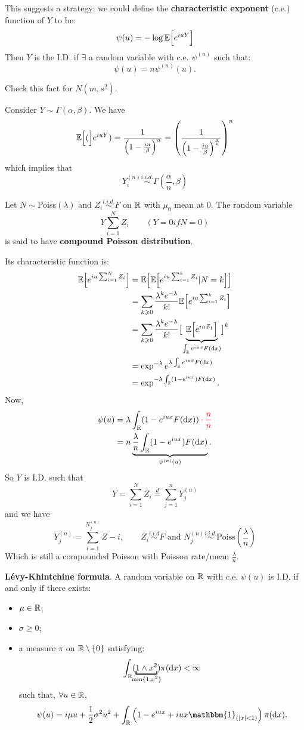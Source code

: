 \documentclass[class=article,crop=false]{standalone}
\begin{document}
This suggests a strategy: we could define the \textbf{characteristic exponent} (c.e.) function of $Y$ to be:
\[
\psi(u)=-\log\mathbb{E}\Bigl[{e^{iuY}}\Bigr]
\]
Then $Y$ is the I.D. if $\exists$ a random variable with c.e. $\psi^{(n)}$ such that:
\[\psi(u)=n\psi^{(n)}(u).\]
\begin{exercise}
	Check this fact for $N(m,s^2)$.
\end{exercise}
\begin{example}
	Consider $Y\sim\Gamma(\alpha,\beta)$. We have
	\[
	\mathbb{E}\Bigl[{(}\Bigr]e^{iuY})=\frac{1}{\left(1-\frac{iu}{\beta}\right)^\alpha}=\left(\frac{1}{\left(1-\frac{iu}{\beta}\right)^\frac{\alpha}{n}}\right)^n
	\]
	which implies that 
	\[
	Y_i^{(n)}\stackrel{i.i.d.}{\sim}\Gamma(\frac{\alpha}{n},\beta)
	\]
\end{example}
\begin{definition}
	Let $N\sim$Poiss$(\lambda)$ and $Z_i\stackrel{i.i.d.}{\sim}F$ on $\mathbb{R}$ with $\mu_0$ mean at 0. The random variable
	\[Y\sum_{i=1}^{N}Z_i\qquad(Y=0 if N=0)\]
	is said to have \textbf{compound Poisson distribution}.
\end{definition}
Its characteristic function is:
\begin{align*}
	\mathbb{E}\Bigl[{e^{iu\sum_{i=1}^{N}Z_i}}\Bigr]&=\mathbb{E}\Bigl[{\mathbb{E}\Bigl[{e^{iu\sum_{i=1}^{k}Z_i}|N=k}\Bigr]}\Bigr]\\
	&=\sum_{k\geqslant0}\frac{\lambda^ke^{-\lambda}}{k!}\mathbb{E}\Bigl[{e^{iu\sum_{i=1}^{k}Z_i}}\Bigr]\\
	&=\sum_{k\geqslant0}\frac{\lambda^ke^{-\lambda}}{k!}\bigl[\underbrace{\mathbb{E}\Bigl[{e^{iuZ_1}}\Bigr]}_{\int_{\mathbb{R}} e^{iux}F(\mathop{}\!\mathrm{d} x)}\bigr]^k\\
	&=\exp^{-\lambda}e^{\lambda\int_{\mathbb{R}} e^{iux}F(\mathop{}\!\mathrm{d} x)}\\
	&=\exp^{-\lambda\int_{\mathbb{R}}(1-e^{iux})F(\mathop{}\!\mathrm{d} x)}.
\end{align*}
Now,
\begin{align*}
	\psi(u)&=\lambda\int_\R(1-e^{iux}F(\dif x))\begingroup\color{red}\cdot\frac{n}{n}\endgroup\\
	&=n\underbrace{\frac{\lambda}{n}\int_\R(1-e^{iux})F(\dif x)}_{\psi^{(n)}(u)}.
\end{align*}
So $Y$ is I.D. such that \[Y=\sum_{i=1}^{N}Z_i\stackrel{d}{=}\sum_{j=1}^{n}Y_j^{(n)}\]
and we have
\[
Y_j^{(n)}=\sum_{i=1}^{N_j^{(n)}}Z-i,\qquad Z_i\stackrel{i.i.d}{\sim}F\text{ and }N_j^{(n)}\stackrel{i.i.d.}{\sim}\text{Poiss}\left(\frac{\lambda}{n}\right)
\]
Which is still a compounded Poisson with Poisson rate/mean $\frac{\lambda}{n}$.
\begin{theorem}
	\textbf{L\'evy-Khintchine formula}. A random variable on $\mathbb{R}$ with c.e. $\psi(u)$ is I.D. if and only if there exists:
	\begin{itemize}
		\item $\mu \in \mathbb{R}$;
		\item $\sigma\geqslant 0$;
		\item a measure $\pi$ on $\mathbb{R}\setminus\{0\}$ satisfying:
		\[\int_\R(\underbracket{1\wedge x^2}_{\mathclap{\min\{1,x^2\}}})\pi(\dif x)<\infty\]
		such that, $\forall u\in\mathbb{R}$,
		\[\psi(u)=i\mu u +\frac{1}{2}\sigma^2 u^2+\int_\R\left(1-e^{iux}+iux\mathbbm{1}_{(|x|<1)}\right)\pi(\dif x).\]
	\end{itemize}
\end{theorem}
\end{document}
